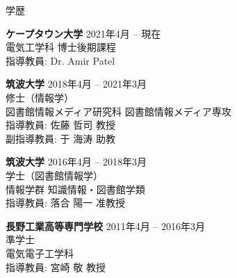 \documentclass{resume} %
\begin{document}

\begin{rSection}{学歴}

    {\bf ケープタウン大学} \hfill {2021年4月 -- 現在}
    \\ 電気工学科 博士後期課程
    \\ 指導教員: Dr. Amir Patel

    {\bf 筑波大学} \hfill {2018年4月 -- 2021年3月}
    \\ 修士（情報学）
    \\ 図書館情報メディア研究科 図書館情報メディア専攻
    \\ 指導教員: 佐藤 哲司 教授
    \\ 副指導教員: 于 海涛 助教

    {\bf 筑波大学} \hfill {2016年4月 -- 2018年3月}
    \\ 学士（図書館情報学）
    \\ 情報学群 知識情報・図書館学類
    \\ 指導教員: 落合 陽一 准教授

    {\bf 長野工業高等専門学校} \hfill {2011年4月 -- 2016年3月}
    \\ 準学士
    \\ 電気電子工学科
    \\ 指導教員: 宮崎 敬 教授

\end{rSection}

\end{document}
